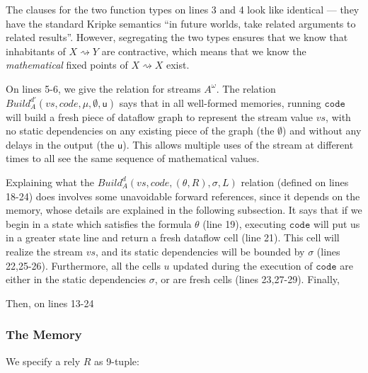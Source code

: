 \documentclass[preprint]{sigplanconf}
\newcommand{\term}[1]{\ensuremath{\mathtt{{#1}}}}
\newcommand{\shrink}{\rightsquigarrow}
\newcommand{\Build}{\mathit{Build}}
\newcommand{\U}{\mathsf{u}}
\begin{document}
The clauses for the two function types on lines 3 and 4 look like
identical --- they have the standard Kripke semantics ``in future
worlds, take related arguments to related results''. However,
segregating the two types ensures that we know that inhabitants of $X
\shrink Y$ are contractive, which means that we know the
\emph{mathematical} fixed points of $X \shrink X$ exist. 

On lines 5-6, we give the relation for streams $A^\omega$. The
relation $\Build^{d'}_A(vs, code, \mu, \emptyset, \U)$ says that in
all well-formed memories, running \term{code} will build a fresh piece
of dataflow graph to represent the stream value $vs$, with no static
dependencies on any existing piece of the graph (the $\emptyset$) and
without any delays in the output (the $\U$). This allows multiple uses
of the stream at different times to all see the same sequence of
mathematical values. 

Explaining what the $\Build^{d}_A(vs, code, (\theta,R), \sigma, L)$
relation (defined on lines 18-24) does involves some unavoidable
forward references, since it depends on the memory, whose details are
explained in the following subsection. It says that if we begin in a
state which satisfies the formula $\theta$ (line 19), executing
\term{code} will put us in a greater state line and return a fresh
dataflow cell (line 21).  This cell will realize the stream $vs$, and
its static dependencies will be bounded by $\sigma$ (lines
22,25-26). Furthermore, all the cells $u$ updated during the execution
of \term{code} are either in the static dependencies $\sigma$, or 
are fresh cells (lines 23,27-29). Finally, 

Then, on lines 13-24

\subsubsection{The Memory}

We specify a rely $R$ as 9-tuple:
\end{document}
